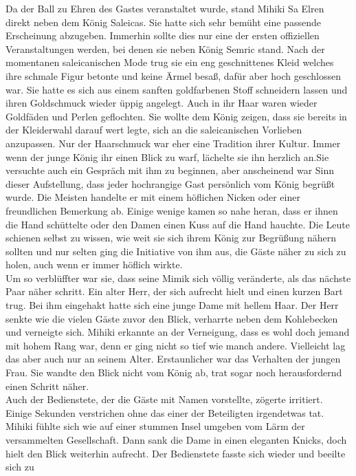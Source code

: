 Da der Ball zu Ehren des Gastes veranstaltet wurde, stand Mihiki Sa Elren direkt neben dem König 
Saleicas. Sie hatte sich sehr bemüht eine passende Erscheinung abzugeben. Immerhin sollte dies nur 
eine der ersten offiziellen Veranstaltungen werden, bei denen sie neben König Semric stand. Nach 
der momentanen saleicanischen Mode trug sie ein eng geschnittenes Kleid welches ihre schmale Figur 
betonte und keine Ärmel besaß, dafür aber hoch geschlossen war. Sie hatte es sich aus einem sanften 
goldfarbenen Stoff schneidern lassen und ihren Goldschmuck wieder üppig angelegt. Auch in ihr Haar 
waren wieder Goldfäden und Perlen geflochten. Sie wollte dem König zeigen, dass sie bereits in der 
Kleiderwahl darauf wert legte, sich an die saleicanischen Vorlieben anzupassen. Nur der Haarschmuck 
war eher eine Tradition ihrer Kultur. Immer wenn der junge König ihr einen Blick zu warf, lächelte 
sie ihn herzlich an.Sie versuchte auch ein Gespräch mit ihm zu beginnen, aber 
anscheinend war Sinn dieser Aufstellung, dass jeder hochrangige Gast persönlich vom König 
begrüßt wurde. Die Meisten handelte er mit einem höflichen Nicken oder einer freundlichen Bemerkung 
ab. Einige wenige kamen so nahe heran, dass er ihnen die Hand schüttelte oder den Damen einen Kuss 
auf die Hand hauchte. Die Leute schienen selbst zu wissen, wie weit sie sich ihrem König zur 
Begrüßung nähern sollten und nur selten ging die Initiative von ihm aus, die Gäste näher zu sich zu 
holen, auch wenn er immer höflich wirkte.\\
Um so verblüffter war sie, dass seine Mimik sich völlig veränderte, als das nächste Paar näher 
schritt. Ein alter Herr, der sich aufrecht hielt und einen kurzen Bart trug. Bei ihm eingehakt 
hatte sich eine junge Dame mit hellem Haar. Der Herr senkte wie die vielen Gäste zuvor den Blick, 
verharrte neben dem Kohlebecken und verneigte sich. Mihiki erkannte an der Verneigung, dass es wohl 
doch jemand mit hohem Rang war, denn er ging nicht so tief wie manch andere. Vielleicht lag das 
aber auch nur an seinem Alter. Erstaunlicher war das Verhalten der jungen Frau. Sie wandte den 
Blick nicht vom König ab, trat sogar noch herausfordernd einen Schritt näher.\\
Auch der Bedienstete, der die Gäste mit Namen vorstellte, zögerte irritiert. Einige Sekunden 
verstrichen ohne das einer der Beteiligten irgendetwas tat. Mihiki fühlte sich wie auf einer 
stummen Insel umgeben vom Lärm der versammelten Gesellschaft. Dann sank die Dame in einen eleganten 
Knicks, doch hielt den Blick weiterhin aufrecht. Der Bedienstete fasste sich wieder und beeilte sich zu 
